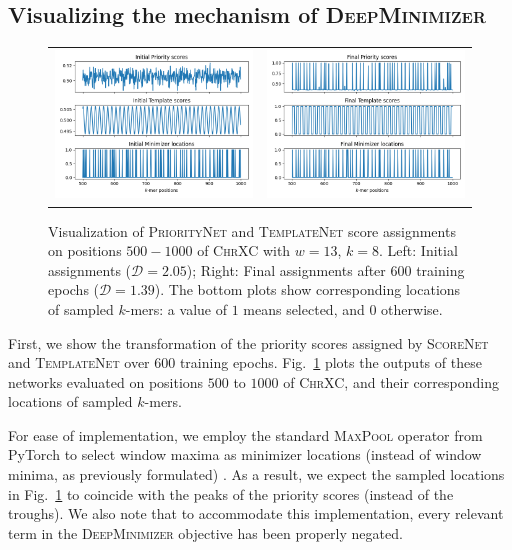 \subsection{Visualizing the mechanism of \textsc{DeepMinimizer}} 
\begin{figure}[h]
\begin{tabular}{cc}
\includegraphics[width=0.47\columnwidth]{minimizer_plots/initial_visualize.png} & 
\includegraphics[width=0.47\columnwidth]{minimizer_plots/visualize.png}
\end{tabular}    
\caption{Visualization of \textsc{PriorityNet} and \textsc{TemplateNet} score assignments on positions $500-1000$ of \textsc{ChrXC} with $w=13$, $k=8$. Left: Initial assignments ($\mathcal{D}=2.05$); Right: Final assignments after $600$ training epochs ($\mathcal{D} = 1.39$). The bottom plots show corresponding locations of sampled $k$-mers: a value of $1$ means selected, and $0$ otherwise.}
\label{app-msd-fig:0}
\end{figure}

\noindent First, we show the transformation of the priority scores assigned by \textsc{ScoreNet} and \textsc{TemplateNet} over $600$ training epochs. Fig.~\ref{app-msd-fig:0} plots the outputs of these networks evaluated on positions $500$ to $1000$ of \textsc{ChrXC}, and their corresponding locations of sampled $k$-mers.

For ease of implementation, we employ the standard \textsc{MaxPool} operator from PyTorch to select window maxima as minimizer locations (instead of window minima, as previously formulated) . As a result, we expect the sampled locations in Fig.~\ref{app-msd-fig:0} to coincide with the peaks of the priority scores (instead of the troughs). We also note that to accommodate this implementation, every relevant term in the \textsc{DeepMinimizer} objective has been properly negated.

